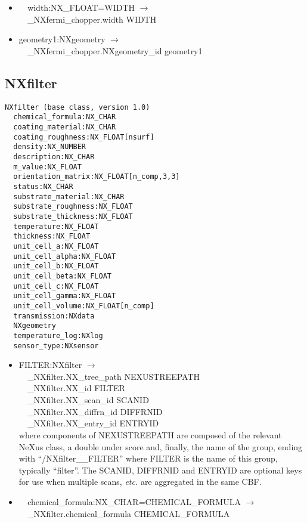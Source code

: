 \documentclass[11pt]{article}
\begin{document}
{{\begin{itemize}
\item{\verb|  |width:NX\_FLOAT=WIDTH $\rightarrow$\\
\verb|  |\_NXfermi\_chopper.width WIDTH}

\item{geometry1:NXgeometry $\rightarrow$\\
\verb|  |\_NXfermi\_chopper.NXgeometry\_id geometry1}
\end{itemize}
\subsection{NXfilter}

\begin{verbatim}
NXfilter (base class, version 1.0)
  chemical_formula:NX_CHAR
  coating_material:NX_CHAR
  coating_roughness:NX_FLOAT[nsurf]
  density:NX_NUMBER
  description:NX_CHAR
  m_value:NX_FLOAT
  orientation_matrix:NX_FLOAT[n_comp,3,3]
  status:NX_CHAR
  substrate_material:NX_CHAR
  substrate_roughness:NX_FLOAT
  substrate_thickness:NX_FLOAT
  temperature:NX_FLOAT
  thickness:NX_FLOAT
  unit_cell_a:NX_FLOAT
  unit_cell_alpha:NX_FLOAT
  unit_cell_b:NX_FLOAT
  unit_cell_beta:NX_FLOAT
  unit_cell_c:NX_FLOAT
  unit_cell_gamma:NX_FLOAT
  unit_cell_volume:NX_FLOAT[n_comp]
  transmission:NXdata
  NXgeometry
  temperature_log:NXlog
  sensor_type:NXsensor
\end{verbatim}

\begin{itemize}

\item{FILTER:NXfilter $\rightarrow$\\
\verb|  |\_NXfilter.NX\_tree\_path    NEXUSTREEPATH \\
\verb|  |\_NXfilter.NX\_id            FILTER\\
\verb|  |\_NXfilter.NX\_scan\_id      SCANID \\
\verb|  |\_NXfilter.NX\_diffrn\_id    DIFFRNID \\
\verb|  |\_NXfilter.NX\_entry\_id     ENTRYID \\
where components of NEXUSTREEPATH are composed of the
relevant NeXus class, a double under score and, finally, the
name of the group, ending with ``/NXfilter\_\_FILTER''
where FILTER is the name of this group, typically ``filter''.
The SCANID, DIFFRNID and ENTRYID are optional keys for use
when multiple scans, {\it etc.} are aggregated in the same CBF.}

\item{\verb|  |chemical\_formula:NX\_CHAR=CHEMICAL\_FORMULA $\rightarrow$\\
\verb|  |\_NXfilter.chemical\_formula CHEMICAL\_FORMULA}


\end{itemize}}}
\end{document}
